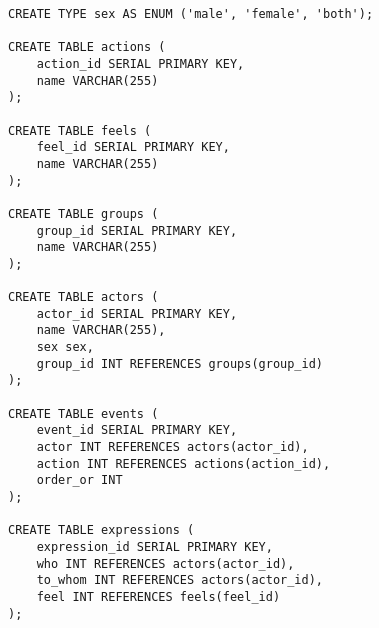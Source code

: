 \begin{verbatim}
CREATE TYPE sex AS ENUM ('male', 'female', 'both');

CREATE TABLE actions (
    action_id SERIAL PRIMARY KEY,
    name VARCHAR(255)
);

CREATE TABLE feels (
    feel_id SERIAL PRIMARY KEY,
    name VARCHAR(255)
);

CREATE TABLE groups (
    group_id SERIAL PRIMARY KEY,
    name VARCHAR(255)
);

CREATE TABLE actors (
    actor_id SERIAL PRIMARY KEY,
    name VARCHAR(255),
    sex sex,
    group_id INT REFERENCES groups(group_id)
);

CREATE TABLE events (
    event_id SERIAL PRIMARY KEY,
    actor INT REFERENCES actors(actor_id),
    action INT REFERENCES actions(action_id),
    order_or INT
);

CREATE TABLE expressions (
    expression_id SERIAL PRIMARY KEY,
    who INT REFERENCES actors(actor_id),
    to_whom INT REFERENCES actors(actor_id),
    feel INT REFERENCES feels(feel_id)
);
\end{verbatim}
